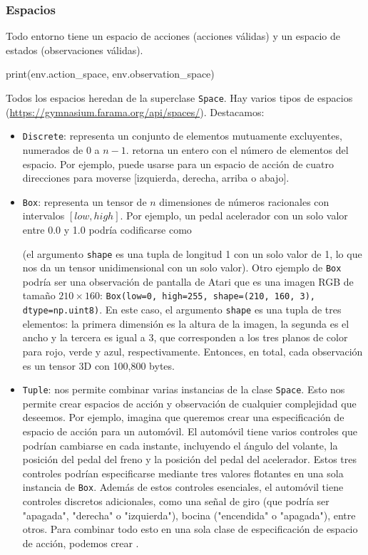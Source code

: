 \documentclass[a4paper, 11pt]{article}
\begin{document}
\subsubsection*{Espacios}

Todo entorno tiene un espacio de acciones (acciones válidas) y un espacio de estados (observaciones válidas). 
\begin{pyverbatim}[][frame=single, fontsize=\scriptsize]
print(env.action_space, env.observation_space)
\end{pyverbatim}
Todos los espacios heredan de la superclase \texttt{Space}. Hay varios tipos de espacios (\url{https://gymnasium.farama.org/api/spaces/}). Destacamos:
\begin{itemize}
\item \texttt{Discrete}: representa un conjunto de elementos mutuamente excluyentes, numerados de 0 a \( n-1 \).  retorna un entero con el número de elementos del espacio. Por ejemplo,  puede usarse para un espacio de acción de cuatro direcciones para moverse [izquierda, derecha, arriba o abajo].

\item \texttt{Box}: representa un tensor de \( n \) dimensiones de números racionales con intervalos \([low, high]\). Por ejemplo, un pedal acelerador con un solo valor entre 0.0 y 1.0 podría codificarse como
 
 (el argumento \texttt{shape} es una tupla de longitud 1 con un solo valor de 1, lo que nos da un tensor unidimensional con un solo valor).  Otro ejemplo de \texttt{Box} podría ser una observación de pantalla de Atari que es una imagen RGB de tamaño $210\times 160$: \texttt{Box(low=0, high=255, shape=(210, 160, 3), dtype=np.uint8)}. En este caso, el argumento \texttt{shape} es una tupla de tres elementos: la primera dimensión es la altura de la imagen, la segunda es el ancho y la tercera es igual a 3, que corresponden a los tres planos de color para rojo, verde y azul, respectivamente. Entonces, en total, cada observación es un tensor 3D con 100,800 bytes.

\item \texttt{Tuple}: nos permite combinar varias instancias de la clase \texttt{Space}. Esto nos permite crear espacios de acción y observación de cualquier complejidad que deseemos. Por ejemplo, imagina que queremos crear una especificación de espacio de acción para un automóvil. El automóvil tiene varios controles que podrían cambiarse en cada instante, incluyendo el ángulo del volante, la posición del pedal del freno y la posición del pedal del acelerador. Estos tres controles podrían especificarse mediante tres valores flotantes en una sola instancia de \texttt{Box}. Además de estos controles esenciales, el automóvil tiene controles discretos adicionales, como una señal de giro (que podría ser "\/apagada", "derecha"\/ o "\/izquierda"), bocina ("\/encendida"\/ o "\/apagada"), entre otros. Para combinar todo esto en una sola clase de especificación de espacio de acción, podemos crear {\footnotesize {}}. 
\end{itemize}
\end{document}
